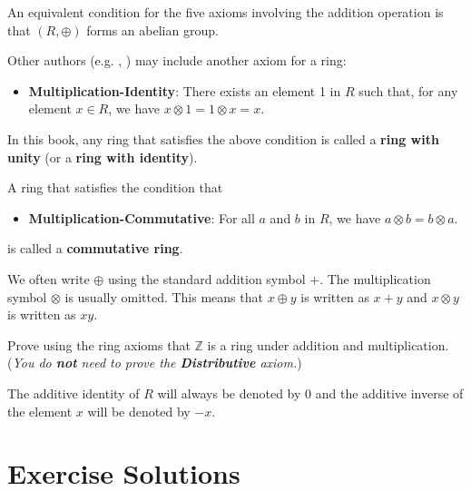 \begin{remark}
    An equivalent condition for the five axioms involving the addition operation is that $(R, \oplus)$ forms an abelian group.
\end{remark}
\begin{remark}
    Other authors (e.g. \cite[p.~136]{cohn_1982}, \cite[pp.~145--146]{clark_1984}) may include another axiom for a ring:
    \begin{itemize}
        \item \textbf{Multiplication-Identity}: There exists an element 1 in $R$ such that, for any element $x \in R$, we have $x \otimes 1 = 1 \otimes x = x$.
    \end{itemize}
    In this book, any ring that satisfies the above condition is called a \textbf{ring with unity} (or a \textbf{ring with identity}).
\end{remark}
\begin{remark}
    A ring that satisfies the condition that
    \begin{itemize}
        \item \textbf{Multiplication-Commutative}: For all $a$ and $b$ in $R$, we have $a \otimes b = b \otimes a$.
    \end{itemize}
    is called a \textbf{commutative ring}.
\end{remark}

We often write $\oplus$ using the standard addition symbol $+$. The multiplication symbol $\otimes$ is usually omitted. This means that $x \oplus y$ is written as $x + y$ and $x \otimes y$ is written as $xy$.


\begin{exercise} %
    Prove using the ring axioms that $\mathbb{Z}$ is a ring under addition and multiplication.\newline
    (\textit{You do \textbf{not} need to prove the \textbf{Distributive} axiom.})
\end{exercise}

The additive identity of $R$ will always be denoted by 0 and the additive inverse of the element $x$ will be denoted by $-x$.

\appendix
\chapter{Exercise Solutions}


